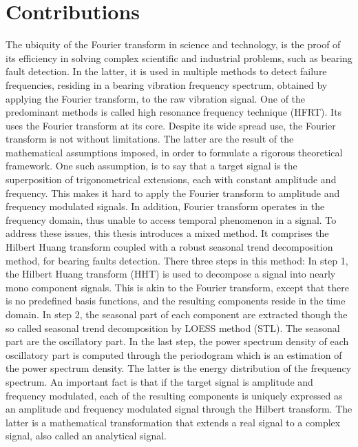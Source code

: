 \documentclass[../Main/thesis.tex]{subfiles}
\begin{document}
\section{Contributions }
\label{sec:contributions}
The ubiquity of the Fourier transform in science and technology, is the proof of its efficiency in solving complex scientific and industrial problems, such as bearing fault detection. In the latter, it is used in multiple methods to detect failure frequencies, residing in a bearing vibration frequency spectrum, obtained by applying the Fourier transform, to the raw vibration signal. One of the predominant methods is called high resonance frequency technique (HFRT). Its uses the Fourier transform at its core.
\justify
Despite its wide spread use, the Fourier transform is not without limitations. The latter are the result of the mathematical assumptions imposed, in order to formulate a rigorous theoretical framework. One such assumption, is to say that a target signal is the superposition of trigonometrical extensions, each with constant amplitude and frequency.
This makes it hard to apply the Fourier transform to amplitude and frequency modulated signals. In addition, Fourier transform operates in the frequency domain, thus unable to access temporal phenomenon in a signal.
\justify
To address these issues, this thesis introduces a mixed method. It comprises the Hilbert Huang transform coupled with a robust seasonal trend decomposition method, for bearing faults detection. There three steps in this method: In step 1, the Hilbert Huang transform (HHT) is used to decompose a signal into nearly mono component signals. This is akin to the Fourier transform, except that there is no predefined basis functions, and the resulting components reside in the time domain. In step 2, the seasonal part of each component are extracted though the so called seasonal trend decomposition by LOESS method (STL). The seasonal part are the oscillatory part. In the last step, the power spectrum density of each oscillatory part is computed through the periodogram which is an estimation of the power spectrum density. The latter is the energy distribution of the frequency spectrum.
\justify
An important fact is that if the target signal is amplitude and frequency modulated, each of the resulting components is uniquely expressed as an amplitude and frequency modulated signal through the Hilbert transform. The latter is a mathematical transformation that extends a real signal to a complex signal, also called an analytical signal.
\justify
%



\blankpage
\end{document}
